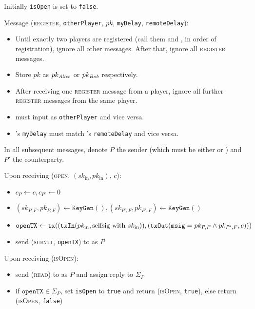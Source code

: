\begin{systembox}{\fch}
  Initially \texttt{isOpen} is set to \texttt{false}.

  Message (\textsc{register}, \texttt{otherPlayer}, $pk$, \texttt{myDelay},
  \texttt{remoteDelay}):
    \begin{itemize}
      \item Until exactly two players are registered (call them \alice{} and
      \bob, in order of registration), ignore all other messages. After that,
      ignore all \textsc{register} messages.
      \item Store $pk$ as $pk_{\mathit{Alice}}$ or $pk_{\mathit{Bob}}$ respectively.
      \item After receiving one \textsc{register} message from a player,
      ignore all further \textsc{register} messages from the same player.
      \item \alice{} must input \bob{} as \texttt{otherPlayer} and vice versa.
      \item \alice's \texttt{myDelay} must match \bob's \texttt{remoteDelay}
      and vice versa.
    \end{itemize}

  In all subsequent messages, denote $P$ the sender (which must be either
  \alice{} or \bob) and $P'$ the counterparty.

  Upon receiving (\textsc{open}, $(sk_{\mathrm{in}}, pk_{\mathrm{in}})$, $c$):
  \begin{itemize}
    \item $c_P \gets c, c_{P'} \gets 0$
    \item $(sk_{P, F}, pk_{P, F}) \gets \mathtt{KeyGen}(), (sk_{P', F},
    pk_{P', F}) \gets \mathtt{KeyGen}()$
    \item $\mathtt{openTX} \gets \texttt{tx}((\mathtt{txIn}(pk_{\mathrm{in}}, \text{selfsig
    with } sk_{\mathrm{in}})), (\mathtt{txOut}(\mathtt{msig} = pk_{P, F} \wedge pk_{P',
    F}, c)))$
    \item send (\textsc{submit}, \texttt{openTX}) to \ledger as $P$
  \end{itemize}

  Upon receiving (\textsc{isOpen}):
  \begin{itemize}
    \item send (\textsc{read}) to \ledger{} as $P$ and assign reply to
    $\Sigma_P$
    \item if $\mathtt{openTX} \in \Sigma_P$, set \texttt{isOpen} to
    \texttt{true} and return (\textsc{isOpen}, \texttt{true}), else return
    (\textsc{isOpen}, \texttt{false})
  \end{itemize}


\end{systembox}
